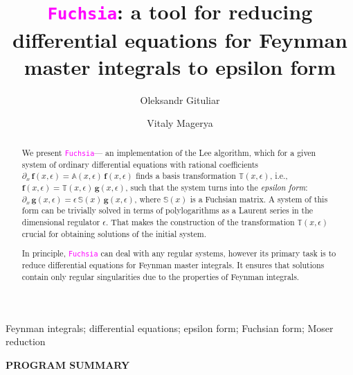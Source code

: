 \documentclass{elsarticle}
\newcommand{\eps}{\epsilon}
\newcommand{\fuchsia}{\textcolor{fuchsia}{\texttt{Fuchsia}}\xspace}
\newcommand{\M}[1]{\mathbb{#1}} %
\newcommand{\V}[1]{\mathbf{#1}} %
\begin{document}
\begin{frontmatter}

\title{\fuchsia: a tool for reducing differential equations for Feynman master integrals to epsilon form}

\author{Oleksandr Gituliar}
\address{II. Institut f\"ur Theoretische Physik, Universit\"at Hamburg, Luruper Chaussee 149, D-22761 Hamburg, Germany}

\author{Vitaly Magerya}
\address{Novomoskovsk, Ukarine}


\begin{abstract}
We present \fuchsia\xspace --- an implementation of the Lee algorithm, which for a given system of ordinary differential equations with rational coefficients $\partial_x\,\V f(x,\eps) = \M A(x,\eps)\,\V f(x,\eps)$ finds a basis transformation $\M T(x,\eps)$, i.e., $\V f(x,\eps) = \M T(x,\eps)\,\V g(x,\eps)$, such that the system turns into the \textit{epsilon form}: $\partial_x\, \V g(x,\eps) = \eps\,\M S(x)\,\V g(x,\eps)$, where $\M S(x)$ is a Fuchsian matrix.
A system of this form can be trivially solved in terms of polylogarithms as a Laurent series in the dimensional regulator $\eps$.
That makes the construction of the transformation $\M T(x,\eps)$ crucial for obtaining solutions of the initial system.

In principle, \fuchsia can deal with any regular systems, however its primary task is to reduce differential equations for Feynman master integrals.
It ensures that solutions contain only regular singularities due to the properties of Feynman integrals.
\end{abstract}


\begin{keyword}
Feynman integrals; differential equations; epsilon form; Fuchsian form; Moser reduction
\end{keyword}

\end{frontmatter}

\newpage


{\bf PROGRAM SUMMARY}
\end{document}
